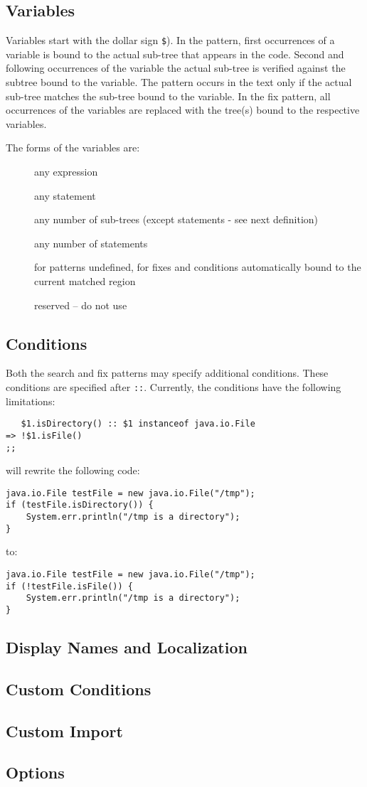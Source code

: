 \documentclass{article}
\begin{document}
\subsection{Variables}

Variables start with the dollar sign \verb=$=). In the pattern, first occurrences
of a variable is bound to the actual sub-tree that appears in the code. Second and
following occurrences of the variable the actual sub-tree is verified against the subtree
bound to the variable. The pattern occurs in the text only if the actual sub-tree
matches the sub-tree bound to the variable. In the fix pattern, all occurrences of
the variables are replaced with the tree(s) bound to the respective variables.

The forms of the variables are:
\begin{description}
\item[\simplevariable]{any expression}
\item[\statementvariable]{any statement}
\item[\multipletreevariable]{any number of sub-trees (except statements - see next definition)}
\item[\multiplestatementvariable]{any number of statements}
\item[\wholepattern]{for patterns undefined, for fixes and conditions automatically bound to the current matched region}
\item[\reserved]{reserved -- do not use}
\end{description}

\subsection{Conditions}

Both the search and fix patterns may specify additional conditions. These conditions
are specified after \verb=::=. Currently, the conditions have the following
limitations:

\begin{verbatim}
   $1.isDirectory() :: $1 instanceof java.io.File
=> !$1.isFile()
;;
\end{verbatim}

will rewrite the following code:
\begin{verbatim}
java.io.File testFile = new java.io.File("/tmp");
if (testFile.isDirectory()) {
    System.err.println("/tmp is a directory");
}
\end{verbatim}
to:
\begin{verbatim}
java.io.File testFile = new java.io.File("/tmp");
if (!testFile.isFile()) {
    System.err.println("/tmp is a directory");
}
\end{verbatim}

\subsection{Display Names and Localization}

\subsection{Custom Conditions}

\subsection{Custom Import}

\subsection{Options}
\end{document}
